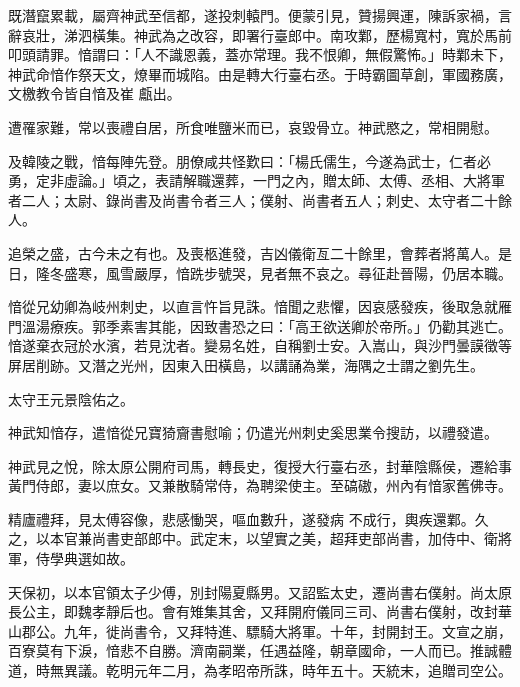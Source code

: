 \begin{pinyinscope}
 既潛竄累載，屬齊神武至信都，遂投刺轅門。便蒙引見，贊揚興運，陳訴家禍，言辭哀壯，涕泗橫集。神武為之改容，即署行臺郎中。南攻鄴，歷楊寬村，寬於馬前叩頭請罪。愔謂曰：「人不識恩義，蓋亦常理。我不恨卿，無假驚怖。」時鄴未下，神武命愔作祭天文，燎畢而城陷。由是轉大行臺右丞。于時霸圖草創，軍國務廣，文檄教令皆自愔及崔
 甗出。



 遭罹家難，常以喪禮自居，所食唯鹽米而已，哀毀骨立。神武愍之，常相開慰。



 及韓陵之戰，愔每陣先登。朋僚咸共怪歎曰：「楊氏儒生，今遂為武士，仁者必勇，定非虛論。」頃之，表請解職還葬，一門之內，贈太師、太傅、丞相、大將軍者二人；太尉、錄尚書及尚書令者三人；僕射、尚書者五人；刺史、太守者二十餘人。



 追榮之盛，古今未之有也。及喪柩進發，吉凶儀衛亙二十餘里，會葬者將萬人。是日，隆冬盛寒，風雪嚴厚，愔跣步號哭，見者無不哀之。尋征赴晉陽，仍居本職。



 愔從兄幼卿為岐州刺史，以直言忤旨見誅。愔聞之悲懼，因哀感發疾，後取急就雁
 門溫湯療疾。郭季素害其能，因致書恐之曰：「高王欲送卿於帝所。」仍勸其逃亡。愔遂棄衣冠於水濱，若見沈者。變易名姓，自稱劉士安。入嵩山，與沙門曇謨徵等屏居削跡。又潛之光州，因東入田橫島，以講誦為業，海隅之士謂之劉先生。



 太守王元景陰佑之。



 神武知愔存，遣愔從兄寶猗齎書慰喻；仍遣光州刺史奚思業令搜訪，以禮發遣。



 神武見之悅，除太原公開府司馬，轉長史，復授大行臺右丞，封華陰縣侯，遷給事黃門侍郎，妻以庶女。又兼散騎常侍，為聘梁使主。至碻磝，州內有愔家舊佛寺。



 精廬禮拜，見太傅容像，悲感慟哭，嘔血數升，遂發病
 不成行，輿疾還鄴。久之，以本官兼尚書吏部郎中。武定末，以望實之美，超拜吏部尚書，加侍中、衛將軍，侍學典選如故。



 天保初，以本官領太子少傅，別封陽夏縣男。又詔監太史，遷尚書右僕射。尚太原長公主，即魏孝靜后也。會有雉集其舍，又拜開府儀同三司、尚書右僕射，改封華山郡公。九年，徙尚書令，又拜特進、驃騎大將軍。十年，封開封王。文宣之崩，百寮莫有下淚，愔悲不自勝。濟南嗣業，任遇益隆，朝章國命，一人而已。推誠體道，時無異議。乾明元年二月，為孝昭帝所誅，時年五十。天統末，追贈司空公。




\end{pinyinscope}
